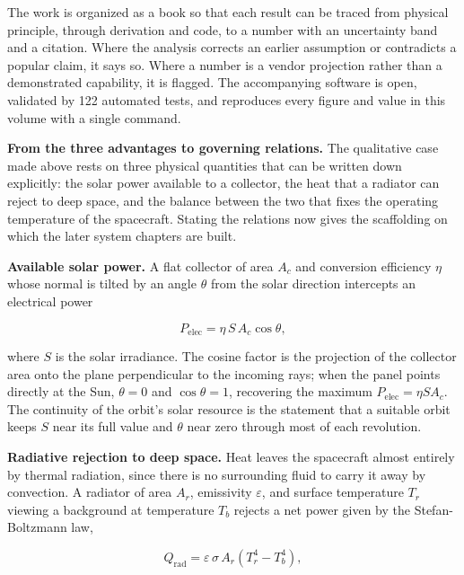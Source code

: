 \documentclass[
  11pt,
  openany,
  oneside]{book}
\begin{document}
The work is organized as a book so that each result can be traced from
physical principle, through derivation and code, to a number with an
uncertainty band and a citation. Where the analysis corrects an earlier
assumption or contradicts a popular claim, it says so. Where a number is
a vendor projection rather than a demonstrated capability, it is
flagged. The accompanying software is open, validated by 122 automated
tests, and reproduces every figure and value in this volume with a
single command.

\textbf{From the three advantages to governing relations.} The
qualitative case made above rests on three physical quantities that can
be written down explicitly: the solar power available to a collector,
the heat that a radiator can reject to deep space, and the balance
between the two that fixes the operating temperature of the spacecraft.
Stating the relations now gives the scaffolding on which the later
system chapters are built.

\textbf{Available solar power.} A flat collector of area \(A_{c}\) and
conversion efficiency \(\eta\) whose normal is tilted by an angle
\(\theta\) from the solar direction intercepts an electrical power

\begin{equation}
P_{\text{elec}} = \eta\, S\, A_{c} \cos\theta, \tag{1.1}
\end{equation}

where \(S\) is the solar irradiance. The cosine factor is the projection
of the collector area onto the plane perpendicular to the incoming rays;
when the panel points directly at the Sun, \(\theta = 0\) and
\(\cos\theta = 1\), recovering the maximum
\(P_{\text{elec}} = \eta S A_{c}\). The continuity of the orbit's solar
resource is the statement that a suitable orbit keeps \(S\) near its
full value and \(\theta\) near zero through most of each revolution.

\textbf{Radiative rejection to deep space.} Heat leaves the spacecraft
almost entirely by thermal radiation, since there is no surrounding
fluid to carry it away by convection. A radiator of area \(A_{r}\),
emissivity \(\varepsilon\), and surface temperature \(T_{r}\) viewing a
background at temperature \(T_{b}\) rejects a net power given by the
Stefan-Boltzmann law,

\begin{equation}
Q_{\text{rad}} = \varepsilon\, \sigma\, A_{r}\left(T_{r}^{4} - T_{b}^{4}\right), \tag{1.2}
\end{equation}
\end{document}
